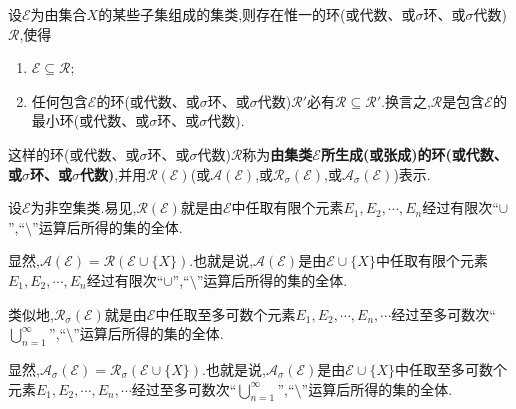 \documentclass[../../main.tex]{subfiles}%
\begin{document}
\begin{theorem}\label{theorem:集合论--定理1.3.7}
设$\mathscr{E}$为由集合$X$的某些子集组成的集类,则存在惟一的环(或代数、或$\sigma$环、或$\sigma$代数)$\mathscr{R}$,使得
\begin{enumerate}[(1)]
\item $\mathscr{E} \subseteq \mathscr{R}$;
\item 任何包含$\mathscr{E}$的环(或代数、或$\sigma$环、或$\sigma$代数)$\mathscr{R}'$必有$\mathscr{R} \subseteq \mathscr{R}'$.换言之,$\mathscr{R}$是包含$\mathscr{E}$的最小环(或代数、或$\sigma$环、或$\sigma$代数).
\end{enumerate}
这样的环(或代数、或$\sigma$环、或$\sigma$代数)$\mathscr{R}$称为\textbf{由集类$\mathscr{E}$所生成(或张成)的环(或代数、或$\sigma$环、或$\sigma$代数)},并用$\mathscr{R}(\mathscr{E})$(或$\mathscr{A}(\mathscr{E})$,或$\mathscr{R}_\sigma(\mathscr{E})$,或$\mathscr{A}_\sigma(\mathscr{E})$)表示.
\end{theorem}
\begin{remark}
设$\mathscr{E}$为非空集类.易见,$\mathscr{R}(\mathscr{E})$就是由$\mathscr{E}$中任取有限个元素$E_1,E_2,\cdots,E_n$经过有限次“$\cup$”,“$\setminus$”运算后所得的集的全体.

显然,$\mathscr{A}(\mathscr{E}) = \mathscr{R}(\mathscr{E} \cup \{X\})$.也就是说,$\mathscr{A}(\mathscr{E})$是由$\mathscr{E} \cup \{X\}$中任取有限个元素$E_1,E_2,\cdots,E_n$经过有限次“$\cup$”,“$\setminus$”运算后所得的集的全体.

类似地,$\mathscr{R}_\sigma(\mathscr{E})$就是由$\mathscr{E}$中任取至多可数个元素$E_1,E_2,\cdots,E_n,\cdots$经过至多可数次“$\bigcup_{n=1}^{\infty}$”,“$\setminus$”运算后所得的集的全体.

显然,$\mathscr{A}_\sigma(\mathscr{E}) = \mathscr{R}_\sigma(\mathscr{E} \cup \{X\})$.也就是说,$\mathscr{A}_\sigma(\mathscr{E})$是由$\mathscr{E} \cup \{X\}$中任取至多可数个元素$E_1,E_2,\cdots,E_n,\cdots$经过至多可数次“$\bigcup_{n=1}^{\infty}$”,“$\setminus$”运算后所得的集的全体.
\end{remark}
\end{document}
